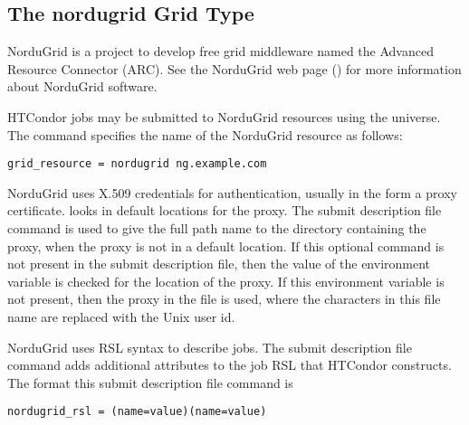 
\subsection{\label{sec:NorduGrid}The nordugrid Grid Type }

NorduGrid is a project to develop free grid middleware named
the Advanced  Resource Connector (ARC).
See the NorduGrid web page ()
for more information about NorduGrid software.

HTCondor jobs may be submitted to
NorduGrid resources using the  universe.
The  command specifies the name of the
NorduGrid resource as follows:
\begin{verbatim}
grid_resource = nordugrid ng.example.com
\end{verbatim}

NorduGrid uses X.509 credentials for authentication,
usually in the form a proxy certificate. 
 looks in default locations for the proxy. 
The submit description file command 
is used to give the full path name to the directory containing the proxy,
when the proxy is not in a default location.
If this optional command is not present in the submit description file,
then the value of the environment variable
 is checked for the location of the proxy.
If this environment variable is not present, then 
the proxy in the file
 is used,
where the characters \verb@XXXX@ in this file name are
replaced with the Unix user id.

NorduGrid uses RSL syntax to describe jobs.
The submit description file command
adds additional attributes to the job RSL that HTCondor
constructs. 
The format this submit description file command is
\begin{verbatim}
nordugrid_rsl = (name=value)(name=value)
\end{verbatim}
